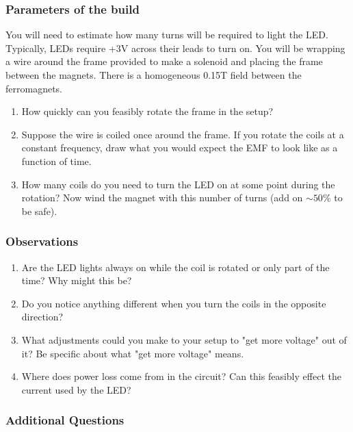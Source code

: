 \documentclass[12pt]{book}
\begin{document}
\subsubsection{Parameters of the build}

You will need to estimate how many turns will be required to light the LED.  Typically, LEDs require +3V across their leads to turn on.  You will be wrapping a wire around the frame provided to make a solenoid and placing the frame between the magnets.  There is a homogeneous 0.15T field between the ferromagnets.

\begin{enumerate}
 \item How quickly can you feasibly rotate the frame in the setup?
  \item Suppose the wire is coiled once around the frame.  If you rotate the coils at a constant frequency, draw what you would expect the EMF to look like as a function of time.
  \item How many coils do you need to turn the LED on at some point during the rotation?  Now wind the magnet with this number of turns (add on $\sim50\%$ to be safe). \\
\end{enumerate}

\subsubsection{Observations}

\begin{enumerate}
 \item Are the LED lights always on while the coil is rotated or only part of the time? Why might this be?

 \item Do you notice anything different when you turn the coils in the opposite direction?

 \item What adjustments could you make to your setup to "get more voltage" out of it? Be specific about what "get more voltage" means.

 \item Where does power loss come from in the circuit?  Can this feasibly effect the current used by the LED?
\end{enumerate}

\subsubsection{ Additional Questions}
\end{document}
